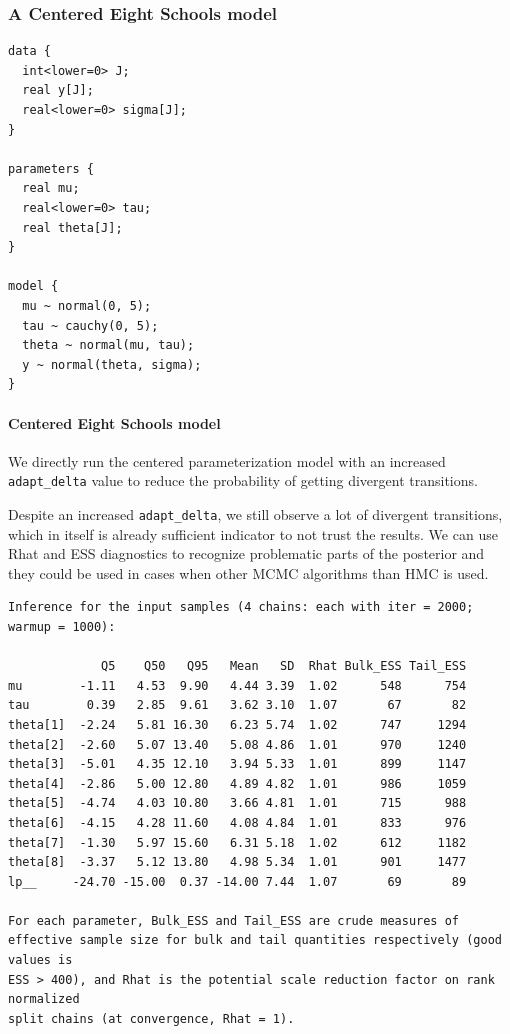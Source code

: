 \documentclass[american,]{article}
\let\oldparagraph\paragraph
\renewcommand{\paragraph}[1]{\oldparagraph{#1}\mbox{}}
\begin{document}
\FloatBarrier

\hypertarget{a-centered-eight-schools-model}{%
\subsubsection{A Centered Eight Schools
model}\label{a-centered-eight-schools-model}}

\begin{verbatim}
data {
  int<lower=0> J;
  real y[J];
  real<lower=0> sigma[J];
}

parameters {
  real mu;
  real<lower=0> tau;
  real theta[J];
}

model {
  mu ~ normal(0, 5);
  tau ~ cauchy(0, 5);
  theta ~ normal(mu, tau);
  y ~ normal(theta, sigma);
}
\end{verbatim}

\hypertarget{centered-eight-schools-model}{%
\paragraph{Centered Eight Schools
model}\label{centered-eight-schools-model}}

We directly run the centered parameterization model with an increased
\texttt{adapt\_delta} value to reduce the probability of getting
divergent transitions.

Despite an increased \texttt{adapt\_delta}, we still observe a lot of
divergent transitions, which in itself is already sufficient indicator
to not trust the results. We can use Rhat and ESS diagnostics to
recognize problematic parts of the posterior and they could be used in
cases when other MCMC algorithms than HMC is used.

\begin{verbatim}
Inference for the input samples (4 chains: each with iter = 2000; warmup = 1000):

             Q5    Q50   Q95   Mean   SD  Rhat Bulk_ESS Tail_ESS
mu        -1.11   4.53  9.90   4.44 3.39  1.02      548      754
tau        0.39   2.85  9.61   3.62 3.10  1.07       67       82
theta[1]  -2.24   5.81 16.30   6.23 5.74  1.02      747     1294
theta[2]  -2.60   5.07 13.40   5.08 4.86  1.01      970     1240
theta[3]  -5.01   4.35 12.10   3.94 5.33  1.01      899     1147
theta[4]  -2.86   5.00 12.80   4.89 4.82  1.01      986     1059
theta[5]  -4.74   4.03 10.80   3.66 4.81  1.01      715      988
theta[6]  -4.15   4.28 11.60   4.08 4.84  1.01      833      976
theta[7]  -1.30   5.97 15.60   6.31 5.18  1.02      612     1182
theta[8]  -3.37   5.12 13.80   4.98 5.34  1.01      901     1477
lp__     -24.70 -15.00  0.37 -14.00 7.44  1.07       69       89

For each parameter, Bulk_ESS and Tail_ESS are crude measures of 
effective sample size for bulk and tail quantities respectively (good values is 
ESS > 400), and Rhat is the potential scale reduction factor on rank normalized
split chains (at convergence, Rhat = 1).
\end{verbatim}
\end{document}

